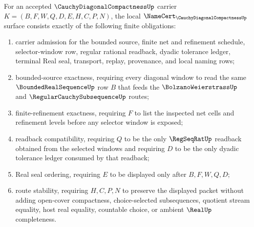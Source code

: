 \begin{theorem}
\label{thm:cauchy-diagonal-compactness-namecert-obligations}
For an accepted $\CauchyDiagonalCompactnessUp$ carrier $K=(B,F,W,Q,D,E,H,C,P,N)$, the local $\NameCert_{\CauchyDiagonalCompactnessUp}$ surface consists exactly of the following finite obligations:
\begin{enumerate}
\item carrier admission for the bounded source, finite net and refinement schedule, selector-window row, regular rational readback, dyadic tolerance ledger, terminal Real seal, transport, replay, provenance, and local naming rows;
\item bounded-source exactness, requiring every diagonal window to read the same $\BoundedRealSequenceUp$ row $B$ that feeds the $\BolzanoWeierstrassUp$ and $\RegularCauchySubsequenceUp$ routes;
\item finite-refinement exactness, requiring $F$ to list the inspected net cells and refinement levels before any selector window is exposed;
\item readback compatibility, requiring $Q$ to be the only $\RegSeqRatUp$ readback obtained from the selected windows and requiring $D$ to be the only dyadic tolerance ledger consumed by that readback;
\item Real seal ordering, requiring $E$ to be displayed only after $B,F,W,Q,D$;
\item route stability, requiring $H,C,P,N$ to preserve the displayed packet without adding open-cover compactness, choice-selected subsequences, quotient stream equality, host real equality, countable choice, or ambient $\RealUp$ completeness.
\end{enumerate}
\end{theorem}

